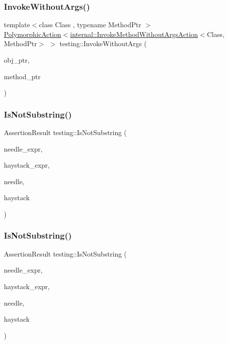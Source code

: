 \subsubsection{\texorpdfstring{InvokeWithoutArgs()}{InvokeWithoutArgs()}\hspace{0.1cm}{\footnotesize\ttfamily [2/2]}}
{\footnotesize\ttfamily template$<$class Class , typename Method\+Ptr $>$ \\
\mbox{\hyperlink{classtesting_1_1PolymorphicAction}{Polymorphic\+Action}}$<$\mbox{\hyperlink{classtesting_1_1internal_1_1InvokeMethodWithoutArgsAction}{internal\+::\+Invoke\+Method\+Without\+Args\+Action}}$<$Class, Method\+Ptr$>$ $>$ testing\+::\+Invoke\+Without\+Args (\begin{DoxyParamCaption}\item[{Class $\ast$}]{obj\+\_\+ptr,  }\item[{Method\+Ptr}]{method\+\_\+ptr }\end{DoxyParamCaption})}

\mbox{\label{namespacetesting_a2288dcf4249f88af67dcd46544dc49a6}} 
\subsubsection{\texorpdfstring{IsNotSubstring()}{IsNotSubstring()}\hspace{0.1cm}{\footnotesize\ttfamily [1/3]}}
{\footnotesize\ttfamily Assertion\+Result testing\+::\+Is\+Not\+Substring (\begin{DoxyParamCaption}\item[{const char $\ast$}]{needle\+\_\+expr,  }\item[{const char $\ast$}]{haystack\+\_\+expr,  }\item[{const char $\ast$}]{needle,  }\item[{const char $\ast$}]{haystack }\end{DoxyParamCaption})}

\mbox{\label{namespacetesting_a53e5c6e91ea429c43de7f4f57e33d166}} 
\subsubsection{\texorpdfstring{IsNotSubstring()}{IsNotSubstring()}\hspace{0.1cm}{\footnotesize\ttfamily [2/3]}}
{\footnotesize\ttfamily Assertion\+Result testing\+::\+Is\+Not\+Substring (\begin{DoxyParamCaption}\item[{const char $\ast$}]{needle\+\_\+expr,  }\item[{const char $\ast$}]{haystack\+\_\+expr,  }\item[{const wchar\+\_\+t $\ast$}]{needle,  }\item[{const wchar\+\_\+t $\ast$}]{haystack }\end{DoxyParamCaption})}


